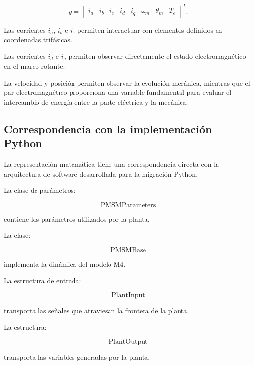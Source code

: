 \begin{equation}
y =
\begin{bmatrix}
i_a &
i_b &
i_c &
i_d &
i_q &
\omega_m &
\theta_m &
T_e
\end{bmatrix}^{T}.
\end{equation}

Las corrientes $i_a$, $i_b$ e $i_c$ permiten interactuar con elementos definidos en coordenadas trifásicas.

Las corrientes $i_d$ e $i_q$ permiten observar directamente el estado electromagnético en el marco rotante.

La velocidad y posición permiten observar la evolución mecánica, mientras que el par electromagnético proporciona una variable fundamental para evaluar el intercambio de energía entre la parte eléctrica y la mecánica.

\subsection{Correspondencia con la implementación Python}

La representación matemática tiene una correspondencia directa con la arquitectura de software desarrollada para la migración Python.

La clase de parámetros:

\begin{equation}
\mathrm{PMSMParameters}
\end{equation}

contiene los parámetros utilizados por la planta.

La clase:

\begin{equation}
\mathrm{PMSMBase}
\end{equation}

implementa la dinámica del modelo M4.

La estructura de entrada:

\begin{equation}
\mathrm{PlantInput}
\end{equation}

transporta las señales que atraviesan la frontera de la planta.

La estructura:

\begin{equation}
\mathrm{PlantOutput}
\end{equation}

transporta las variables generadas por la planta.


